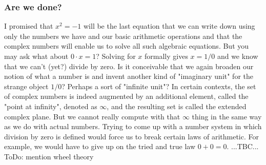 \subsubsection{Are we done?}
I promised that $x^2 = -1$ will be the last equation that we can write down using only the numbers we have and our basic arithmetic operations and that the complex numbers will enable us to solve all such algebraic equations. But you may ask what about $0 \cdot x = 1$? Solving for $x$ formally gives $x = 1/0$ and we know that we can't (yet?) divide by zero. Is it conceivable that we again broaden our notion of what a number is and invent another kind of "imaginary unit" for the strange object $1/0$? Perhaps a sort of "infinite unit"? In certain contexts, the set of complex numbers is indeed augmented by an additional element, called the "point at infinity", denoted as $\infty$, and the resulting set is called the extended complex plane. But we cannot really compute with that $\infty$ thing in the same way as we do with actual numbers. Trying to come up with a number system in which division by zero is defined would force us to break certain laws of arithmetic. For example, we would have to give up on the tried and true law $0 + 0 = 0$. ...TBC... ToDo: mention wheel theory








